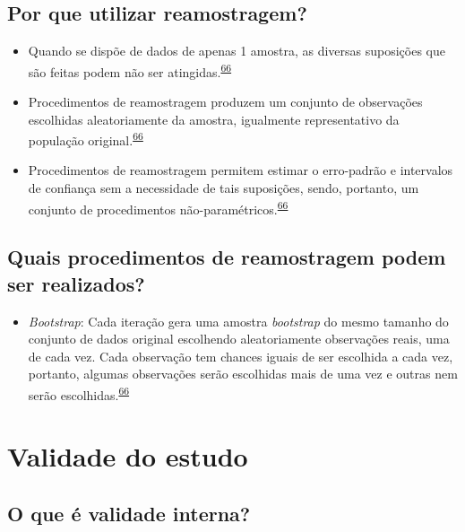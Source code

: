 \documentclass[
]{book}
\providecommand{\tightlist}{%
  \setlength{\itemsep}{0pt}\setlength{\parskip}{0pt}}
\begin{document}
\hypertarget{por-que-utilizar-reamostragem}{%
\subsection{Por que utilizar reamostragem?}\label{por-que-utilizar-reamostragem}}

\begin{itemize}
\item
  Quando se dispõe de dados de apenas 1 amostra, as diversas suposições que são feitas podem não ser atingidas.\textsuperscript{\protect\hyperlink{ref-Bland2015}{66}}
\item
  Procedimentos de reamostragem produzem um conjunto de observações escolhidas aleatoriamente da amostra, igualmente representativo da população original.\textsuperscript{\protect\hyperlink{ref-Bland2015}{66}}
\item
  Procedimentos de reamostragem permitem estimar o erro-padrão e intervalos de confiança sem a necessidade de tais suposições, sendo, portanto, um conjunto de procedimentos não-paramétricos.\textsuperscript{\protect\hyperlink{ref-Bland2015}{66}}
\end{itemize}

\hypertarget{quais-procedimentos-de-reamostragem-podem-ser-realizados}{%
\subsection{Quais procedimentos de reamostragem podem ser realizados?}\label{quais-procedimentos-de-reamostragem-podem-ser-realizados}}

\begin{itemize}
\tightlist
\item
  \emph{Bootstrap}: Cada iteração gera uma amostra \emph{bootstrap} do mesmo tamanho do conjunto de dados original escolhendo aleatoriamente observações reais, uma de cada vez. Cada observação tem chances iguais de ser escolhida a cada vez, portanto, algumas observações serão escolhidas mais de uma vez e outras nem serão escolhidas.\textsuperscript{\protect\hyperlink{ref-Bland2015}{66}}
\end{itemize}

\hypertarget{validade-estudo}{%
\section{Validade do estudo}\label{validade-estudo}}

\hypertarget{o-que-uxe9-validade-interna}{%
\subsection{O que é validade interna?}\label{o-que-uxe9-validade-interna}}
\end{document}
